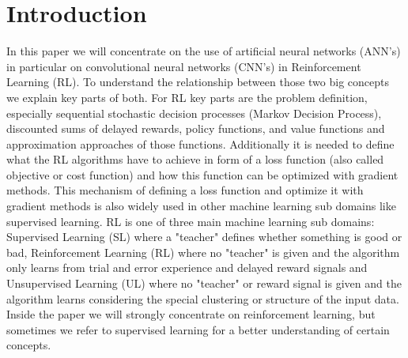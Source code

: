 \documentclass[conference]{IEEEtran}
\begin{document}


\section{Introduction}
In this paper we will concentrate on the use of artificial neural networks (ANN's) in particular on convolutional neural networks (CNN's) in Reinforcement Learning (RL). To understand the relationship between those two big concepts we explain key parts of both. For RL key parts are the problem definition, especially sequential stochastic decision processes (Markov Decision Process), discounted sums of delayed rewards, policy functions, and value functions and approximation approaches of those functions. Additionally it is needed to  define what the RL algorithms have to achieve in form of a loss function (also called objective or cost function) and how this function can be optimized with gradient methods. This mechanism of defining a loss function and optimize it with gradient methods is also widely used in other machine learning sub domains like supervised learning. RL is one of three main machine learning sub domains: Supervised Learning (SL) where a "teacher" defines whether something is good or bad, Reinforcement Learning (RL) where no "teacher" is given and the algorithm only learns from trial and error experience and delayed reward signals and Unsupervised Learning (UL) where no "teacher" or reward signal is given and the algorithm learns considering the special clustering or structure of the input data. Inside the paper we will strongly concentrate on reinforcement learning, but sometimes we refer to supervised learning for a better understanding of certain concepts. \\
\end{document}
